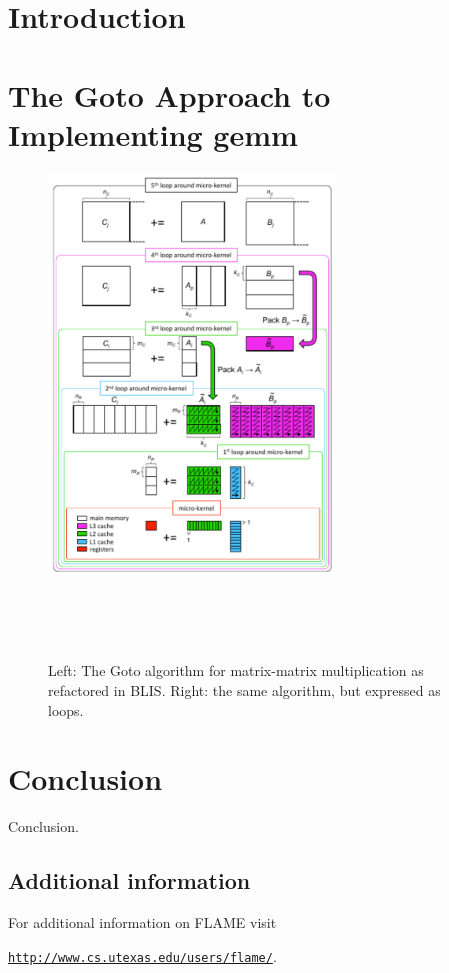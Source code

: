 \section{Introduction}
\label{sec:introduction}

\section{The Goto Approach to Implementing {\sc gemm}}
\label{sec:BLIS}

\begin{figure}[tb!]
\begin{center}
\begin{minipage}{3in}
\mbox{\includegraphics[width=3.0in]{mm_blis_color.pdf}}
\end{minipage}
~~~
\begin{minipage}[t]{3in}
\footnotesize  
\mbox{  }
\end{minipage}
\end{center}
\caption{Left: The Goto algorithm for matrix-matrix multiplication as  
  refactored in BLIS.  Right: the same algorithm, but expressed as  
  loops.}
\label{fig:blis_gemm}
\end{figure}

\cite{Goto:2008:AHP}
\cite{BLIS1}
\cite{BLIS2}
\cite{BLIS3}
\cite{BLIS4}

\section{Conclusion}
\label{sec:conclusion}

Conclusion.


\subsection*{Additional information}

For additional information on FLAME visit
\begin{center}
\href{http://www.cs.utexas.edu/users/flame/}
     {\tt http://www.cs.utexas.edu/users/flame/}.
\end{center}
